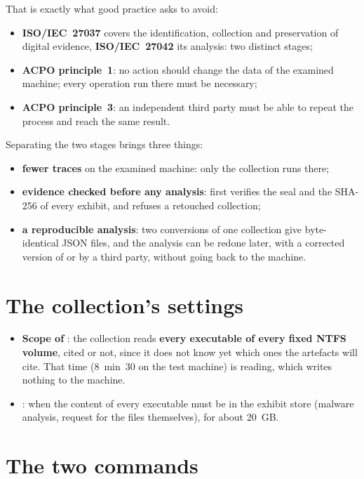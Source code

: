 \documentclass[11pt,a4paper,oneside]{report}
\begin{document}
That is exactly what good practice asks to avoid:
\begin{itemize}
  \item \textbf{ISO/IEC~27037} covers the identification, collection and
        preservation of digital evidence, \textbf{ISO/IEC~27042} its analysis:
        two distinct stages;
  \item \textbf{ACPO principle~1}: no action should change the data of the
        examined machine; every operation run there must be necessary;
  \item \textbf{ACPO principle~3}: an independent third party must be able to
        repeat the process and reach the same result.
\end{itemize}

Separating the two stages brings three things:
\begin{itemize}
  \item \textbf{fewer traces} on the examined machine: only the collection runs
        there;
  \item \textbf{evidence checked before any analysis}:  first
        verifies the seal and the SHA-256 of every exhibit, and refuses a
        retouched collection;
  \item \textbf{a reproducible analysis}: two conversions of one collection
        give byte-identical JSON files, and the analysis can be redone later,
        with a corrected version of \wac{} or by a third party, without going
        back to the machine.
\end{itemize}

\section{The collection's settings}

\begin{itemize}
  \item \textbf{Scope of }: the collection reads \textbf{every
        executable of every fixed NTFS volume}, cited or not, since it does not
        know yet which ones the artefacts will cite. That time (8~min~30 on the
        test machine) is reading, which writes nothing to the machine.
  \item \textbf{}: when the content of every executable must be
        in the exhibit store (malware analysis, request for the files
        themselves), for about 20~GB.
\end{itemize}

\section{The two commands}
\end{document}
